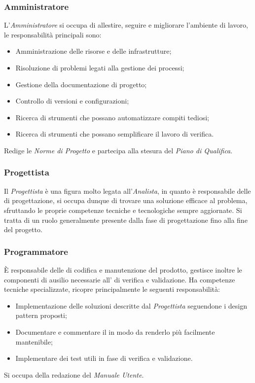\documentclass{scalatekids-article}
\begin{document}
\subsubsection{Amministratore}
L'\textit{Amministratore} si occupa di allestire, seguire e migliorare
l'ambiente di lavoro, le responsabilità principali sono:
\begin{itemize}
\item Amministrazione delle risorse e delle infrastrutture;
\item Risoluzione di problemi legati alla gestione dei processi;
\item Gestione della documentazione di progetto;
\item Controllo di versioni e configurazioni;
\item Ricerca di strumenti che possano automatizzare compiti tediosi;
\item Ricerca di strumenti che possano semplificare il lavoro di verifica.
\end{itemize}
Redige le \textit{Norme di Progetto} e partecipa alla stesura del \textit{Piano
  di Qualifica}.

\subsubsection{Progettista}

Il \textit{Progettista} è una figura molto legata all'\textit{Analista}, in
quanto è responsabile delle  di progettazione, si occupa dunque di
trovare una soluzione efficace al problema, sfruttando le proprie competenze
tecniche e tecnologiche sempre aggiornate. Si tratta di un ruolo generalmente
presente dalla fase di progettazione fino alla fine del progetto.
\subsubsection{Programmatore}
È responsabile delle  di codifica e manutenzione del prodotto, gestisce
inoltre le componenti di ausilio necessarie all' di verifica e
validazione. Ha competenze tecniche specializzate, ricopre principalmente
le seguenti responsabilità:
\begin{itemize}
\item Implementazione delle soluzioni descritte dal \textit{Progettista}
  seguendone i design pattern proposti;
\item Documentare e commentare il  in modo da renderlo più facilmente
  mantenibile;
\item Implementare dei test utili in fase di verifica e validazione.
\end{itemize}
Si occupa della redazione del \textit{Manuale Utente}.
\end{document}
